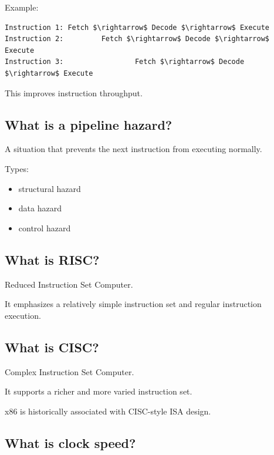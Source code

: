 Example:

\begin{lstlisting}
Instruction 1: Fetch $\rightarrow$ Decode $\rightarrow$ Execute
Instruction 2:         Fetch $\rightarrow$ Decode $\rightarrow$ Execute
Instruction 3:                 Fetch $\rightarrow$ Decode $\rightarrow$ Execute
\end{lstlisting}

This improves instruction throughput.

\medskip

\subsection{What is a pipeline hazard?}

A situation that prevents the next instruction from executing normally.

Types:

\begin{itemize}
  \item structural hazard
  \item data hazard
  \item control hazard
\end{itemize}

\medskip

\subsection{What is RISC?}

Reduced Instruction Set Computer.

It emphasizes a relatively simple instruction set and regular instruction execution.

\medskip

\subsection{What is CISC?}

Complex Instruction Set Computer.

It supports a richer and more varied instruction set.

x86 is historically associated with CISC-style ISA design.

\medskip

\subsection{What is clock speed?}

